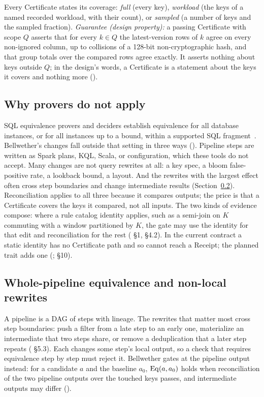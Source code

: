 Every Certificate states its coverage: \emph{full} (every key),
\emph{workload} (the keys of a named recorded workload, with their count), or
\emph{sampled} (a number of keys and the sampled fraction).
\emph{Guarantee (design property):} a passing Certificate with scope $Q$
asserts that for every $k \in Q$ the latest-version rows of $k$ agree on every
non-ignored column, up to collisions of a 128-bit non-cryptographic hash, and
that group totals over the compared rows agree exactly. It asserts nothing
about keys outside $Q$; in the design's words, a Certificate is a statement
about the keys it covers and nothing more ().

\subsection{Why provers do not apply}\label{sec:provers}

SQL equivalence provers and deciders establish equivalence for all database
instances, or for all instances up to a bound, within a supported SQL
fragment~\cite{cosette,qed,sqlsolver,verieql}. Bellwether's changes fall outside
that setting in three ways (). Pipeline steps are written as Spark
plans, KQL, Scala, or configuration, which these tools do not accept. Many
changes are not query rewrites at all: a key spec, a bloom false-positive rate,
a lookback bound, a layout. And the rewrites with the largest effect often cross
step boundaries and change intermediate results
(Section~\ref{sec:nonlocal}). Reconciliation applies to all three because it
compares outputs; the price is that a Certificate covers the keys it compared,
not all inputs. The two kinds of evidence compose: where a rule catalog identity
applies, such as a semi-join on $K$ commuting with a window partitioned by $K$,
the gate may use the identity for that edit and reconciliation for the rest
( \S1, \S4.2). In the current contract a static identity has no
Certificate path and so cannot reach a Receipt; the planned 
trait adds one (;  \S10).

\subsection{Whole-pipeline equivalence and non-local rewrites}\label{sec:nonlocal}

A pipeline is a DAG of steps with lineage. The rewrites that matter most cross
step boundaries: push a filter from a late step to an early one, materialize an
intermediate that two steps share, or remove a deduplication that a later step
repeats ( \S5.3). Each changes some step's local output, so a
check that requires equivalence step by step must reject it. Bellwether gates at
the pipeline output instead: for a candidate $a$ and the baseline $a_0$,
$\mathrm{Eq}(a, a_0)$ holds when reconciliation of the two pipeline outputs over the
touched keys passes, and intermediate outputs may differ ().

